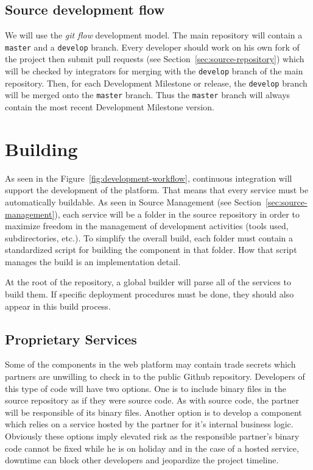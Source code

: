 \documentclass{learnpad}
\begin{document}
\subsection{Source development flow}
\label{sec:source-development-flow}

We will use the \emph{git flow}\cite{kreeftmeijer:2010} development model. The main repository will
contain a \texttt{master} and a \texttt{develop} branch. Every developer should work on his
own fork of the project then submit pull requests (see Section~\ref{sec:source-repository})
which will be checked by integrators for merging with the \texttt{develop} branch of the main
repository. Then, for each Development Milestone or release, the \texttt{develop} branch will
be merged onto the \texttt{master} branch. Thus the \texttt{master} branch will always contain
the most recent Development Milestone version.

\section{Building}
\label{sec:building}

As seen in the Figure~\ref{fig:development-workflow}, continuous integration will support the
development of the platform. That means that every service must be automatically buildable.
As seen in Source Management (see Section~\ref{sec:source-management}), each service will be a
folder in the source repository in order to maximize freedom in the management of development
activities (tools used, subdirectories, etc.). To simplify the overall build, each folder must
contain a standardized script for building the component in that folder. How that script manages
the build is an implementation detail.

At the root of the repository, a global builder will parse all of the services to build them.
If specific deployment procedures must be done, they should also appear in this build process.

\subsection{Proprietary Services}
\label{sec:proprietary-services}

Some of the components in the \learnpad web platform may contain trade secrets which partners
are unwilling to check in to the public Github repository. Developers of this type of
code will have two options. One is to include binary files in the source
repository as if they were source code. As with source code, the partner will be responsible of
its binary files. Another option is to
develop a component which relies on a service hosted by the partner for it's internal business
logic. Obviously these options imply elevated risk as the responsible partner's binary code
cannot be fixed while he is on holiday and in the case of a hosted service, downtime can block
other developers and jeopardize the project timeline.
\end{document}

